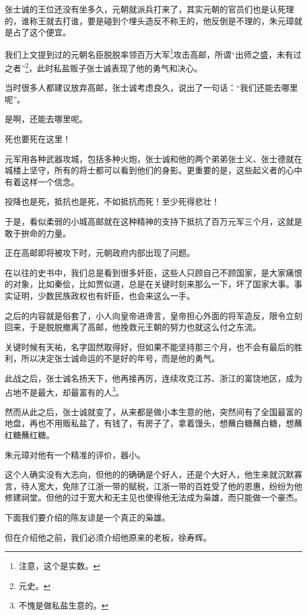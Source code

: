 \begin{multicols}{\theparacolNo}
		张士诚的王位还没有坐多久，元朝就派兵打来了，其实元朝的官员们也是认死理的，谁称王就去打谁，要是碰到个埋头造反不称王的，他反倒是不理的，朱元璋就是占了这个便宜。

		我们上文提到过的元朝名臣脱脱率领百万大军\footnote{注意，这个是实数。}攻击高邮，所谓“出师之盛，未有过之者”\footnote{元史。}，此时私盐贩子张士诚表现了他的勇气和决心。

		当时很多人都建议放弃高邮，张士诚考虑良久，说出了一句话：“我们还能去哪里呢”。

		是啊，还能去哪里呢。

		死也要死在这里！

		元军用各种武器攻城，包括多种火炮，张士诚和他的两个弟弟张士义、张士德就在城楼上坚守，所有的将士都可以看到他们的身影。更重要的是，这些起义者的心中有着这样一个信念。

		投降也是死，抵抗也是死，不如抵抗而死！至少死得悲壮！

		于是，看似柔弱的小城高邮就在这种精神的支持下抵抗了百万元军三个月，这就是敢于拚命的力量。

		正在高邮即将被攻下时，元朝政府内部出现了问题。

		在以往的史书中，我们总是看到很多奸臣，这些人只顾自己不顾国家，是大家痛恨的对象，比如秦侩，比如贾似道，总是在关键时刻来那么一下，坏了国家大事。事实证明，少数民族政权也有奸臣，也会来这么一手。

		之后的内容就是俗套了，小人向皇帝进谗言，皇帝担心外面的将军造反，限令立刻回来，于是脱脱撤离了高邮，他挽救元王朝的努力也就这么付之东流。

		关键时候有天祐，名字固然取得好，但如果不能坚持那三个月，也不会有最后的胜利，所以决定张士诚命运的不是好的年号，而是他的勇气。

		此战之后，张士诚名扬天下，他再接再厉，连续攻克江苏、浙江的富饶地区，成为占地不是最大，却最富有的人\footnote{不愧是做私盐生意的。}。

		然而从此之后，张士诚就变了，从来都是做小本生意的他，突然间有了全国最富的地盘，再也不用贩私盐了，有钱了，有房子了，拿着馒头，想蘸白糖蘸白糖，想蘸红糖蘸红糖。

		朱元璋对他有一个精准的评价，器小。

		这个人确实没有大志向，但他的的确确是个好人，还是个大好人，他生来就沉默寡言，待人宽大，免除了江浙一带的赋税，江浙一带的百姓受了他的恩惠，纷纷为他修建祠堂。但他的过于宽大和无主见也使得他无法成为枭雄，而只能做一个豪杰。

		下面我们要介绍的陈友谅是一个真正的枭雄。

		但在介绍他之前，我们必须介绍他原来的老板，徐寿辉。


\end{multicols}
